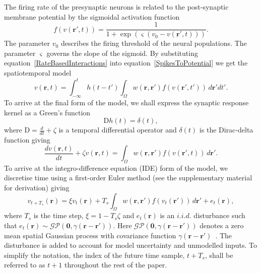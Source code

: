 \documentclass[12pt]{iopart}
\begin{document}
The firing rate of the presynaptic neurons is related to the post-synaptic membrane potential by the sigmoidal activation function 
\begin{equation}
	\label{ActivationFunction} f\left( v\left( \mathbf{r}', t \right) \right) = \frac{1}{1 + \exp \left( \varsigma \left( v_0 - v\left(\mathbf{r}',t\right) \right) \right)}. 
\end{equation}
The parameter $v_0$ describes the  firing threshold of the neural populations. The parameter $\varsigma$ governs the slope of the sigmoid. By substituting equation~\ref{RateBasedInteractions} into equation~\ref{SpikesToPotential} we get the spatiotemporal model 
\begin{equation}
	\label{FullDoubleIntModel} v\left(\mathbf{r},t\right) =
	\int_{-\infty}^t 
	h\left(t - t'\right) \int_\Omega
	w\left(\mathbf{r},\mathbf{r}'\right) 
	f\left( v\left( \mathbf{r}',t' \right)\right)
	\, d\mathbf{r}'dt'.
\end{equation}
To arrive at the final form of the model, we shall express the synaptic response kernel as a Green's function 
\begin{equation}
	\label{GreensFuncDef} \textrm{D}h\left( t \right) = \delta \left( t \right), 
\end{equation}
where $\textrm{D}=\frac{d}{dt} + \zeta$ is a temporal differential operator and $\delta(t)$ is the Dirac-delta function giving 
\begin{equation}
	\label{FinalFormContinuous} 
	\frac{dv\left( \mathbf{r},t \right)}{dt} + \zeta v\left( \mathbf{r},t \right) = \int_\Omega {w\left( \mathbf{r},\mathbf{r}' \right)f\left( {v\left( \mathbf{r}',t \right)} \right)\, d\mathbf{r}'}. 
\end{equation}
To arrive at the integro-difference equation (IDE) form of the model, we discretise time using a first-order Euler method (see the supplementary material for derivation) giving 
\begin{equation}
	\label{DiscreteTimeModel} 
	v_{t+T_s}\left(\mathbf{r}\right) = 
	\xi v_t\left(\mathbf{r}\right) + 
	T_s \int_\Omega { 
	    w\left(\mathbf{r},\mathbf{r}'\right)
	    f\left(v_t\left(\mathbf{r}'\right)\right) 
	\, d\mathbf{r}'} 
	+ e_t\left(\mathbf{r}\right), 
\end{equation}
where $T_s$ is the time step, $\xi = 1-T_s\zeta $ and $e_t(\mathbf{r})$ is an $i.i.d.$ disturbance such that $e_t(\mathbf{r})\sim\mathcal{GP}(\mathbf 0,\gamma(\mathbf{r}-\mathbf{r}'))$. Here $\mathcal{GP}(\mathbf 0,\gamma(\mathbf{r}-\mathbf{r}'))$ denotes a zero mean spatial Gaussian process with covariance function $\gamma(\mathbf{r}-\mathbf{r}')$~\cite{Rasmussen2005}. The disturbance is added to account for model uncertainty and unmodelled inputs. To simplify the notation, the index of the future time sample, $t+T_s$, shall be referred to as $t+1$ throughout the rest of the paper. 
\end{document}
